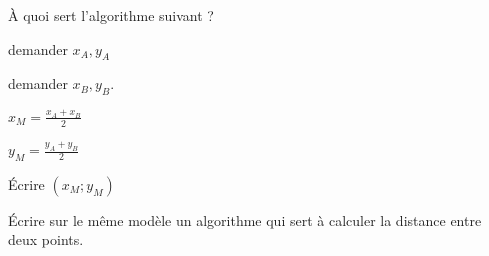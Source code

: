 
\begin{exercice}\label{exosmath-0696}

    À quoi sert l'algorithme suivant ?

    \begin{fmpage}{0.9\linewidth}
        demander \( x_A,y_A\)

        demander \( x_B,y_B\).

        \( x_M=\frac{ x_A+x_B }{2}\)

        \( y_M=\frac{ y_A+y_B }{ 2 }\)

        Écrire \( (x_M;y_M)\)
    \end{fmpage}

    Écrire sur le même modèle un algorithme qui sert à calculer la distance entre deux points.

\end{exercice}
